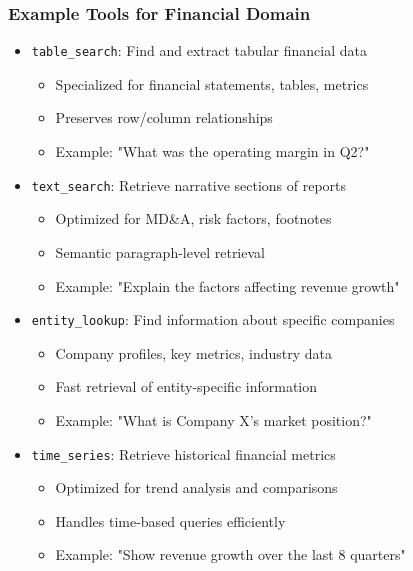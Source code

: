 {    \begin{frame}
        \frametitle{Example Tools for Financial Domain}
        \begin{itemize}
            \item \texttt{table\_search}: Find and extract tabular financial data
            \begin{itemize}
                \item Specialized for financial statements, tables, metrics
                \item Preserves row/column relationships
                \item Example: "What was the operating margin in Q2?"
            \end{itemize}
            \item \texttt{text\_search}: Retrieve narrative sections of reports
            \begin{itemize}
                \item Optimized for MD\&A, risk factors, footnotes
                \item Semantic paragraph-level retrieval
                \item Example: "Explain the factors affecting revenue growth"
            \end{itemize}
            \item \texttt{entity\_lookup}: Find information about specific companies
            \begin{itemize}
                \item Company profiles, key metrics, industry data
                \item Fast retrieval of entity-specific information
                \item Example: "What is Company X's market position?"
            \end{itemize}
            \item \texttt{time\_series}: Retrieve historical financial metrics
            \begin{itemize}
                \item Optimized for trend analysis and comparisons
                \item Handles time-based queries efficiently
                \item Example: "Show revenue growth over the last 8 quarters"
            \end{itemize}
        \end{itemize}
    \end{frame}

}
